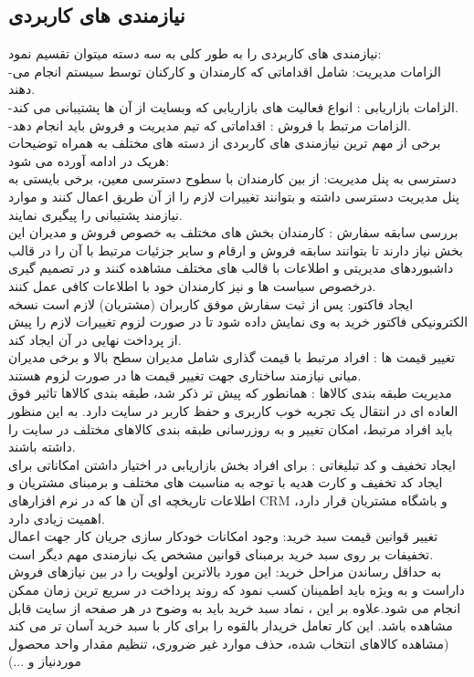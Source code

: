 \documentclass[14pt]{article}
\begin{document}
\begin{flushright}
\begin{itemize}
\section{نیازمندی های کاربردی }
نیازمندی های کاربردی را به طور کلی به سه دسته میتوان تقسیم نمود:\\
-الزامات مدیریت: شامل اقداماتی که کارمندان و کارکنان توسط سیستم انجام می دهند. \\
-الزامات بازاریابی : انواع فعالیت های بازاریابی که وبسایت از آن ها پشتیبانی می کند. \\
-الزامات مرتبط با فروش : اقداماتی که تیم مدیریت و فروش باید انجام دهد.\\
برخی از مهم ترین نیازمندی های کاربردی از دسته های مختلف به همراه توضیحات هریک در ادامه آورده می شود:\\
دسترسی به پنل مدیریت: از بین کارمندان با سطوح دسترسی معین، برخی بایستی به پنل مدیریت دسترسی داشته و بتوانند تغییرات لازم را از آن طریق اعمال کنند و موارد نیازمند پشتیبانی را پیگیری نمایند.\\
بررسی سابقه سفارش : کارمندان بخش های مختلف به خصوص فروش و مدیران این بخش نیاز دارند تا بتوانند سابقه فروش و ارقام و سایر جزئیات مرتبط با آن را در قالب داشبوردهای مدیریتی و اطلاعات با قالب های مختلف مشاهده کنند و در تصمیم گیری درخصوص سیاست ها و نیز کارمندان خود با اطلاعات کافی عمل کنند.\\
ایجاد فاکتور: پس از ثبت سفارش موفق کاربران (مشتریان) لازم است نسخه الکترونیکی فاکتور خرید به وی نمایش داده شود تا در صورت لزوم تغییرات لازم را پیش از پرداخت نهایی در آن ایجاد کند.\\
تغییر قیمت ها : افراد مرتبط با قیمت گذاری شامل مدیران سطح بالا و برخی مدیران میانی نیازمند ساختاری جهت تغییر قیمت ها در صورت لزوم هستند.\\
مدیریت طبقه بندی کالاها : همانطور که پیش تر ذکر شد، طبقه بندی کالاها تاثیر فوق العاده ای در انتقال یک تجربه خوب کاربری و حفظ کاربر در سایت دارد. به این منظور باید افراد مرتبط، امکان تغییر و به روزرسانی طبقه بندی کالاهای مختلف در سایت را داشته باشند.\\
ایجاد تخفیف و کد تبلیغاتی : برای افراد بخش بازاریابی در اختیار داشتن امکاناتی  برای ایجاد کد تخفیف و کارت هدیه با توجه به مناسبت های مختلف و برمبنای مشتریان و اطلاعات تاریخچه ای آن ها که در نرم افزارهای CRM و باشگاه مشتریان قرار دارد، اهمیت زیادی دارد.\\
تغییر قوانین قیمت سبد خرید: وجود امکانات خودکار سازی جریان کار جهت اعمال تخفیفات بر روی سبد خرید برمبنای قوانین مشخص یک نیازمندی مهم دیگر است.\\
 به حداقل رساندن مراحل خرید: این مورد بالاترین اولویت را در بین نیازهای فروش داراست و  به ویژه باید اطمینان کسب نمود که روند پرداخت در سریع ترین زمان ممکن انجام می شود.علاوه بر این ، نماد سبد خرید باید به وضوح در هر صفحه از سایت قابل مشاهده باشد. این کار تعامل خریدار بالقوه را برای کار با سبد خرید آسان تر می کند (مشاهده کالاهای انتخاب شده، حذف موارد غیر ضروری، تنظیم مقدار واحد محصول موردنیاز و ...)\\

\end{itemize}
\end{flushright}
\end{document}
